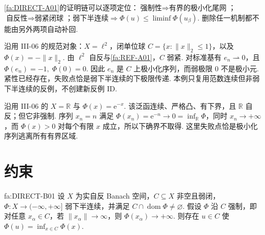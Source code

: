 \begin{FARemark}[直接法的三套不可替代机制]
\autoref{fa:DIRECT-A01}的证明链可以逐项定位：\(\displaystyle\text{强制性}\Rightarrow\text{有界的极小化尾网}\)；\(\displaystyle\text{自反性}\Rightarrow\text{弱紧闭球}\)；\(\displaystyle\text{弱下半连续}\Rightarrow\Phi(u)\leqslant\liminf\Phi(u_\beta)\). 删除任一机制都不能由另外两项自动补回.
\end{FARemark}

\begin{FACounterexample}[弱紧性不能替代弱下半连续]
沿用 III-06 的规范对象：\(\displaystyle X=\ell^2\)，闭单位球 \(\displaystyle C=\{x:\|x\|_2\leqslant1\}\)，以及 \(\displaystyle\Phi(x)=-\|x\|_2\). 由 \(\displaystyle\ell^2\) 自反与\autoref{fa:REF-A01}，\(\displaystyle C\) 弱紧. 对标准基有 \(\displaystyle e_n\rightharpoonup0\)，且
\(\displaystyle \Phi(e_n)=-1, \; \Phi(0)=0\).
因此 \(\displaystyle e_n\) 是 \(\displaystyle C\) 上极小化序列，而弱极限 \(\displaystyle0\) 不是极小元. 紧性已经存在，失败点恰是弱下半连续的下极限传递. 本例只复用范数连续但非弱下半连续的反例，不创建新反例 ID.
\end{FACounterexample}

\begin{FACounterexample}[下半连续与自反性不能阻止逃逸]
沿用 III-06 的 \(\displaystyle X=\mathbb R\) 与 \(\displaystyle\Phi(x)=\mathrm{e}^{-x}\). 该泛函连续、严格凸、有下界，且 \(\displaystyle\mathbb R\) 自反；但它非强制. 序列 \(\displaystyle x_n=n\) 满足 \(\displaystyle\Phi(x_n)=\mathrm{e}^{-n}\to0=\inf_{\mathbb R}\Phi\)，同时 \(\displaystyle x_n\to+\infty\)，而 \(\displaystyle\Phi(x)>0\) 对每个有限 \(\displaystyle x\) 成立，所以下确界不取得. 这里失败点恰是极小化序列逃离所有有界区域.
\end{FACounterexample}

\section{约束}\label{sec:iii07-constraints}

\begin{FATheorem}[B][弱闭约束上的直接法]{fa:DIRECT-B01}
设 \(\displaystyle X\) 为实自反 Banach 空间，\(\displaystyle C\subseteq X\) 非空且弱闭，\(\displaystyle\Phi:X\to(-\infty,+\infty]\) 弱下半连续，并满足 \(\displaystyle C\cap\operatorname{dom}\Phi\neq\varnothing\). 假设 \(\displaystyle\Phi\) 沿 \(\displaystyle C\) 强制，即对任意 \(\displaystyle x_\alpha\in C\)，若 \(\displaystyle\|x_\alpha\|\to\infty\)，则 \(\displaystyle\Phi(x_\alpha)\to+\infty\). 则存在 \(\displaystyle u\in C\) 使
\(\displaystyle \Phi(u) = \inf_{x\in C}\Phi(x)\).
\end{FATheorem}

